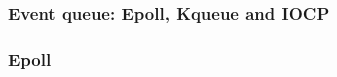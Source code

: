 % 
% 
\begin{frame}[fragile]
    \frametitle{Event queue: Epoll, Kqueue and IOCP}
\end{frame}
% 
% 
% 
% 
\begin{frame}[fragile]
    \frametitle{Epoll}
\end{frame}
% 
% 
